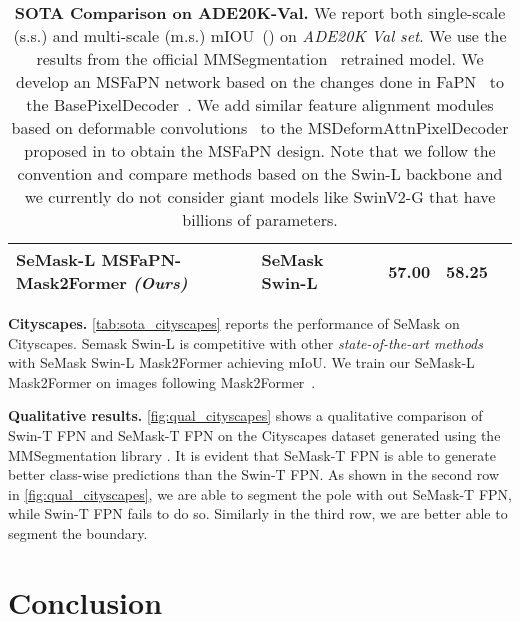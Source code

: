 \documentclass[10pt,twocolumn,letterpaper]{article}
\newcommand{\vspaceundertab}{\vspace{-.2cm}}
\begin{document}
\begin{table*}
{\begin{tabular}{llc|ccc}
    SeMask-L MSFaPN-Mask2Former \textit{(Ours)} & SeMask Swin-L &  & \textbf{57.00} & \textbf{58.25}\\
    \bottomrule
\end{tabular} }
  \vspaceundertab
  \caption{\textbf{SOTA Comparison on ADE20K-Val.} 
      We report both single-scale (s.s.) and multi-scale (m.s.) mIOU~() on \textit{ADE20K Val set}.  We use the results from the official MMSegmentation~\cite{mmseg} retrained model. We develop an MSFaPN network based on the changes done in FaPN~\cite{fapn} to the BasePixelDecoder~\cite{maskformer}. We add similar feature alignment modules based on deformable convolutions~\cite{deform-conv} to the MSDeformAttnPixelDecoder proposed in \cite{mask2former} to obtain the MSFaPN design. Note that we follow the convention and compare methods based on the Swin-L backbone and we currently do not consider giant models like SwinV2-G that have billions of parameters.}
    \label{tab:sota_ade20k}
\end{table*}

\noindent
\textbf{Cityscapes.} \cref{tab:sota_cityscapes} reports the performance of SeMask on Cityscapes. Semask Swin-L is competitive with other \textit{state-of-the-art methods} with SeMask Swin-L Mask2Former achieving  mIoU. We train our SeMask-L Mask2Former on  images following Mask2Former~\cite{mask2former}.

\noindent
\textbf{Qualitative results.}
\cref{fig:qual_cityscapes} shows a qualitative comparison of Swin-T FPN and SeMask-T FPN on the Cityscapes dataset generated using the MMSegmentation library \cite{mmseg}. It is evident that SeMask-T FPN is able to generate better class-wise predictions than the Swin-T FPN. As shown in the second row in \cref{fig:qual_cityscapes}, we are able to segment the pole with out SeMask-T FPN, while Swin-T FPN fails to do so. Similarly in the third row, we are better able to segment the boundary. \section{Conclusion}\vspace{-0.15cm}
\end{document}
